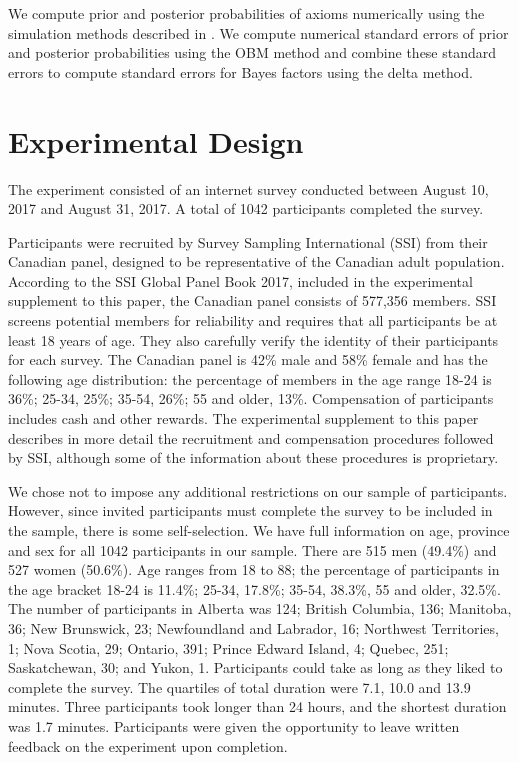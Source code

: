 \documentclass[11pt,letter]{article}
\begin{document}
We compute prior and posterior probabilities of axioms numerically using the simulation methods described in .
We compute numerical standard errors of prior and posterior probabilities using the OBM method and combine these standard errors to compute standard errors for Bayes factors using the delta method.

\section{Experimental Design}\label{s:design}

The experiment consisted of an internet survey conducted between August 10, 2017 and August 31, 2017.
A total of 1042 participants completed the survey.

Participants were recruited by Survey Sampling International (SSI) from their Canadian panel, designed to be representative of the Canadian adult population.
According to the SSI Global Panel Book 2017, included in the experimental supplement to this paper, the Canadian panel consists of 577,356 members.
SSI screens potential members for reliability and requires that all participants be at least 18 years of age.
They also carefully verify the identity of their participants for each survey.
The Canadian panel is 42\% male and 58\% female and has the following age distribution: the percentage of members in the age range 18-24 is 36\%; 25-34, 25\%; 35-54, 26\%; 55 and older, 13\%.
Compensation of participants includes cash and other rewards.
The experimental supplement to this paper describes in more detail the recruitment and compensation procedures followed by SSI, although some of the information about these procedures is proprietary.

We chose not to impose any additional restrictions on our sample of participants.
However, since invited participants must complete the survey to be included in the sample, there is some self-selection.
We have full information on age, province and sex for all 1042 participants in our sample.
There are 515 men (49.4\%) and 527 women (50.6\%).
Age ranges from 18 to 88; the percentage of participants in the age bracket 18-24 is 11.4\%; 25-34, 17.8\%; 35-54, 38.3\%, 55 and older, 32.5\%.
The number of participants in Alberta was 124; British Columbia, 136; Manitoba, 36; New Brunswick, 23; Newfoundland and Labrador, 16; Northwest Territories, 1; Nova Scotia, 29; Ontario, 391; Prince Edward Island, 4; Quebec, 251; Saskatchewan, 30; and Yukon, 1.
Participants could take as long as they liked to complete the survey.
The quartiles of total duration were 7.1, 10.0 and 13.9 minutes.
Three participants took longer than 24 hours, and the shortest duration was 1.7 minutes.
Participants were given the opportunity to leave written feedback on the experiment upon completion.
\end{document}
